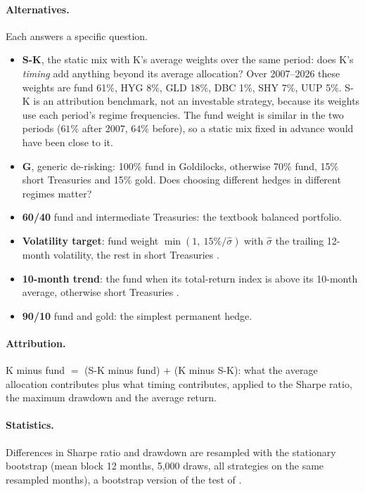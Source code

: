 \documentclass[11pt,a4paper]{article}
\begin{document}
\paragraph{Alternatives.} Each answers a specific question.
\begin{itemize}
\item \textbf{S-K}, the static mix with K's average weights over the same period: does K's \emph{timing} add
anything beyond its average allocation? Over 2007--2026 these weights are fund 61\%, HYG 8\%, GLD 18\%, DBC 1\%, SHY 7\%, UUP 5\%. S-K is an attribution
benchmark, not an investable strategy, because its weights use each period's regime frequencies. The fund weight
is similar in the two periods ($61\%$ after 2007, $64\%$ before), so a static mix fixed in advance would
have been close to it.
\item \textbf{G}, generic de-risking: 100\% fund in Goldilocks, otherwise 70\% fund, 15\% short Treasuries and 15\%
gold. Does choosing different hedges in different regimes matter?
\item \textbf{60/40} fund and intermediate Treasuries: the textbook balanced portfolio.
\item \textbf{Volatility target}: fund weight $\min(1,\ 15\%/\hat\sigma)$ with $\hat\sigma$ the trailing 12-month
volatility, the rest in short Treasuries \citep{moreira2017}.
\item \textbf{10-month trend}: the fund when its total-return index is above its 10-month average, otherwise short
Treasuries \citep{faber2007,moskowitz2012}.
\item \textbf{90/10} fund and gold: the simplest permanent hedge.
\end{itemize}

\paragraph{Attribution.} K minus fund $=$ (S-K minus fund) $+$ (K minus S-K): what the average allocation
contributes plus what timing contributes, applied to the Sharpe ratio, the maximum drawdown and the average
return.

\paragraph{Statistics.} Differences in Sharpe ratio and drawdown are resampled with the stationary bootstrap
\citep{politis1994} (mean block 12 months, 5{,}000 draws, all strategies on the same resampled months), a
bootstrap version of the test of \citet{ledoit2008}.
\end{document}
